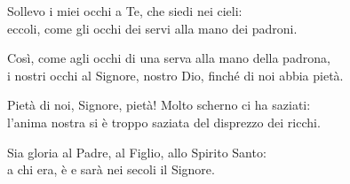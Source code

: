 

\spazio

\strofa Sollevo i miei occhi a Te, che siedi nei cieli:\\
eccoli, come gli occhi dei servi alla mano dei padroni.

\spazio


\spazio

\strofa Così, come agli occhi di una serva alla mano della padrona,\\
i nostri occhi al Signore, nostro Dio, finché di noi abbia pietà.

\spazio


\spazio

\strofa Pietà di noi, Signore, pietà! Molto scherno ci ha saziati:\\
l'anima nostra si è troppo saziata del disprezzo dei ricchi.

\spazio


\spazio

\strofa Sia gloria al Padre, al Figlio, allo Spirito Santo:\\
a chi era, è e sarà nei secoli il Signore.

\spazio

